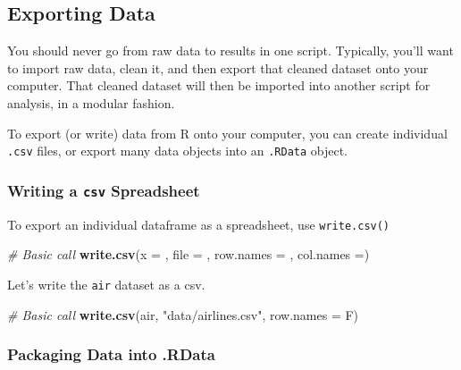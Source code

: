\documentclass[]{book}
\newenvironment{Shaded}{\begin{snugshade}}{\end{snugshade}}
\newcommand{\KeywordTok}[1]{\textcolor[rgb]{0.13,0.29,0.53}{\textbf{#1}}}
\newcommand{\DataTypeTok}[1]{\textcolor[rgb]{0.13,0.29,0.53}{#1}}
\newcommand{\StringTok}[1]{\textcolor[rgb]{0.31,0.60,0.02}{#1}}
\newcommand{\CommentTok}[1]{\textcolor[rgb]{0.56,0.35,0.01}{\textit{#1}}}
\newcommand{\NormalTok}[1]{#1}
\begin{document}
\subsection{Exporting Data}\label{exporting-data}

You should never go from raw data to results in one script. Typically,
you'll want to import raw data, clean it, and then export that cleaned
dataset onto your computer. That cleaned dataset will then be imported
into another script for analysis, in a modular fashion.

To export (or write) data from R onto your computer, you can create
individual \texttt{.csv} files, or export many data objects into an
\texttt{.RData} object.

\subsubsection*{\texorpdfstring{Writing a \texttt{csv}
Spreadsheet}{Writing a csv Spreadsheet}}\label{writing-a-csv-spreadsheet}

To export an individual dataframe as a spreadsheet, use
\texttt{write.csv()}

\begin{Shaded}
\begin{Highlighting}[]
\CommentTok{# Basic call}
\KeywordTok{write.csv}\NormalTok{(}\DataTypeTok{x =}\NormalTok{ , }\DataTypeTok{file =}\NormalTok{ , }\DataTypeTok{row.names =}\NormalTok{ , }\DataTypeTok{col.names =}\NormalTok{)}
\end{Highlighting}
\end{Shaded}

Let's write the \texttt{air} dataset as a csv.

\begin{Shaded}
\begin{Highlighting}[]
\CommentTok{# Basic call}
\KeywordTok{write.csv}\NormalTok{(air, }\StringTok{"data/airlines.csv"}\NormalTok{, }\DataTypeTok{row.names =}\NormalTok{ F)}
\end{Highlighting}
\end{Shaded}

\subsubsection*{Packaging Data into
.RData}\label{packaging-data-into-.rdata}
\end{document}
